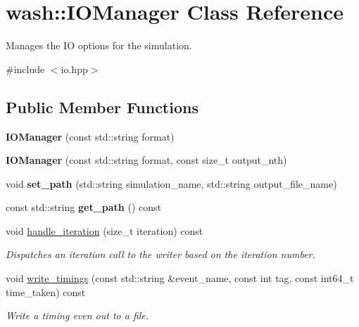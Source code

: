 \hypertarget{classwash_1_1IOManager}{}\section{wash\+:\+:I\+O\+Manager Class Reference}
\label{classwash_1_1IOManager}


Manages the IO options for the simulation.  




{\ttfamily \#include $<$io.\+hpp$>$}

\subsection*{Public Member Functions}
\begin{DoxyCompactItemize}
\item 
\mbox{\label{classwash_1_1IOManager_a700c9e0c1b3f90e408012b7b97fdf74c}} 
{\bfseries I\+O\+Manager} (const std\+::string format)
\item 
\mbox{\label{classwash_1_1IOManager_ae2b51434752a46f631c9c20ecb99e5d2}} 
{\bfseries I\+O\+Manager} (const std\+::string format, const size\+\_\+t output\+\_\+nth)
\item 
\mbox{\label{classwash_1_1IOManager_a7c04519d80a8e1ff53d58a6a7d412209}} 
void {\bfseries set\+\_\+path} (std\+::string simulation\+\_\+name, std\+::string output\+\_\+file\+\_\+name)
\item 
\mbox{\label{classwash_1_1IOManager_a061951b9d8f6c47e625e0bbf27507b01}} 
const std\+::string {\bfseries get\+\_\+path} () const
\item 
void \mbox{\hyperlink{classwash_1_1IOManager_a37c0150160a8e7f4e97951469d9abb30}{handle\+\_\+iteration}} (size\+\_\+t iteration) const
\begin{DoxyCompactList}\small\item\em Dispatches an iteration call to the writer based on the iteration number. \end{DoxyCompactList}\item 
void \mbox{\hyperlink{classwash_1_1IOManager_ae635581c17822a8f18c228952000e6cc}{write\+\_\+timings}} (const std\+::string \&event\+\_\+name, const int tag, const int64\+\_\+t time\+\_\+taken) const
\begin{DoxyCompactList}\small\item\em Write a timing even out to a file. \end{DoxyCompactList}\end{DoxyCompactItemize}


